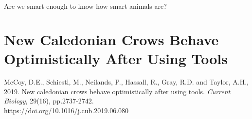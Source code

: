 \begin{savequote}[75mm]
Are we smart enough to know how smart animals are?
\end{savequote}

\chapter{New Caledonian Crows Behave Optimistically After Using Tools}

\newthought{\textcolor{SchoolColor}{Reprinted from:}}
McCoy, D.E., Schiestl, M., Neilands, P., Hassall, R., Gray, R.D. and Taylor, A.H., 2019. New caledonian crows behave optimistically after using tools. \emph{Current Biology}, 29(16), pp.2737-2742.
\\
\newthought{\textcolor{SchoolColor}{Article and supplement available at:}} https://doi.org/10.1016/j.cub.2019.06.080
